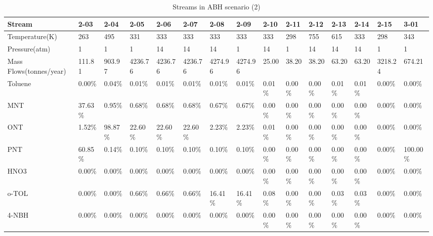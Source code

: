 \begin{landscape}
\begin{table}[H]
\centering
\caption{Streams in ABH scenario (2)}
\label{ABHFST2}
\begin{tabular}{|l|l|l|l|l|l|l|l|l|l|l|l|l|l|l|}
\hline
\textbf{Stream}         & 2-03    & 2-04    & 2-05    & 2-06    & 2-07    & 2-08    & 2-09    & 2-10    & 2-11     & 2-12     & 2-13    & 2-14    & 2-15    & 3-01     \\ \hline
Temperature(K)          & 263     & 495     & 331     & 333     & 333     & 333     & 333     & 333     & 298      & 755      & 615     & 333     & 298     & 343      \\ \hline
Pressure(atm)           & 1       & 1       & 1       & 14      & 14      & 14      & 1       & 14      & 1        & 14       & 14      & 14      & 1       & 1        \\ \hline
Mass Flows(tonnes/year) & 111.81  & 903.97  & 4236.76 & 4236.76 & 4236.76 & 4274.96 & 4274.96 & 25.00   & 38.20    & 38.20    & 63.20   & 63.20   & 3218.24 & 674.21   \\ \hline
Toluene                 & 0.00\%  & 0.04\%  & 0.01\%  & 0.01\%  & 0.01\%  & 0.01\%  & 0.01\%  & 0.01\%  & 0.00\%   & 0.00\%   & 0.01\%  & 0.01\%  & 0.00\%  & 0.00\%   \\ \hline
MNT                     & 37.63\% & 0.95\%  & 0.68\%  & 0.68\%  & 0.68\%  & 0.67\%  & 0.67\%  & 0.00\%  & 0.00\%   & 0.00\%   & 0.00\%  & 0.00\%  & 0.00\%  & 0.00\%   \\ \hline
ONT                     & 1.52\%  & 98.87\% & 22.60\% & 22.60\% & 22.60\% & 2.23\%  & 2.23\%  & 0.01\%  & 0.00\%   & 0.00\%   & 0.00\%  & 0.00\%  & 0.00\%  & 0.00\%   \\ \hline
PNT                     & 60.85\% & 0.14\%  & 0.10\%  & 0.10\%  & 0.10\%  & 0.10\%  & 0.10\%  & 0.00\%  & 0.00\%   & 0.00\%   & 0.00\%  & 0.00\%  & 0.00\%  & 100.00\% \\ \hline
HNO3                    & 0.00\%  & 0.00\%  & 0.00\%  & 0.00\%  & 0.00\%  & 0.00\%  & 0.00\%  & 0.00\%  & 0.00\%   & 0.00\%   & 0.00\%  & 0.00\%  & 0.00\%  & 0.00\%   \\ \hline
o-TOL                   & 0.00\%  & 0.00\%  & 0.66\%  & 0.66\%  & 0.66\%  & 16.41\% & 16.41\% & 0.08\%  & 0.00\%   & 0.00\%   & 0.03\%  & 0.03\%  & 0.00\%  & 0.00\%   \\ \hline
4-NBH                   & 0.00\%  & 0.00\%  & 0.00\%  & 0.00\%  & 0.00\%  & 0.00\%  & 0.00\%  & 0.00\%  & 0.00\%   & 0.00\%   & 0.00\%  & 0.00\%  & 0.00\%  & 0.00\%   \\ \hline

\end{tabular}
\end{table}
\end{landscape}
